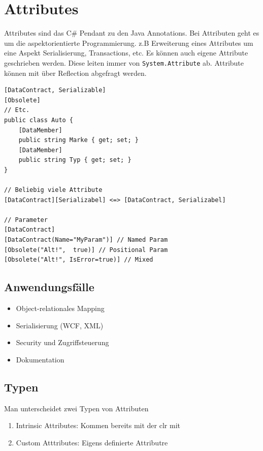 \section{Attributes}
Attributes sind das C\# Pendant zu den Java Annotations. Bei Attributen geht es um die aspektorientierte Programmierung. z.B Erweiterung eines Attributes um eine Aspekt Serialisierung, Transactions, etc. Es können auch eigene Attribute geschrieben werden. Diese leiten immer von \lstinline|System.Attribute| ab. Attribute können mit über Reflection abgefragt werden. 
\begin{lstlisting}[caption=Attributes]
[DataContract, Serializable]
[Obsolete]
// Etc.
public class Auto {
	[DataMember]
	public string Marke { get; set; }
	[DataMember]
	public string Typ { get; set; }
}

// Beliebig viele Attribute
[DataContract][Serializabel] <=> [DataContract, Serializabel]

// Parameter
[DataContract]
[DataContract(Name="MyParam")] // Named Param
[Obsolete("Alt!",  true)] // Positional Param
[Obsolete("Alt!", IsError=true)] // Mixed
\end{lstlisting}

\subsection{Anwendungsfälle}
\begin{itemize}
	\item Object-relationales Mapping
	\item Serialisierung (WCF, XML)
	\item Security und Zugriffsteuerung
	\item Dokumentation
\end{itemize}

\subsection{Typen}
Man unterscheidet zwei Typen von Attributen
\begin{enumerate}
	\item Intrinsic Attributes: Kommen bereits mit der \gls{clr} mit 
	\item Custom Atttributes: Eigens definierte Attributre
\end{enumerate}

\clearpage

